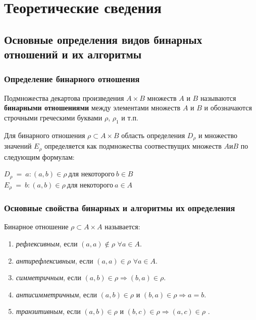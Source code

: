 \documentclass[bachelor, och, labwork]{shiza}
\begin{document}
\section{Теоретические сведения}

\subsection{Основные определения видов бинарных отношений и их алгоритмы}

\subsubsection{Определение бинарного отношения}

Подмножества декартова произведения $A \times B$ множеств $A$ и $B$ называются
\textbf{бинарными отношениями} между элементами множеств $A$ и $B$ и 
обозначаются строчными греческими буквами $\rho$, $\rho_1$ и т.п.

Для бинарного отношения $\rho\subset A \times B$ область определения $D_\rho$ и 
множество значений $E_\rho$ определяется как подмножества соотвествущих множеств 
$A \text{и} B$ по следующим формулам:

\begin{center}
    $D_\rho ~ = ~ {a : (a, b) \in\rho ~ \text{для некоторого} ~ b \in B}$
    $E_\rho ~ = ~ {b : (a, b) \in\rho ~ \text{для некоторого} ~ a \in A}$
\end{center}

\subsubsection{Основные свойства бинарных и алгоритмы их определения}

Бинарное отношение $\rho \subset A \times A$ называется:

\begin{enumerate}
    
    \item \textit{рефлексивным}, если $(a,a) \not\in\rho$ $\forall a \in A$.
    
    \item \textit{антирефлексивным}, если $(a,a) \in\rho$ $\forall a \in A$.
    
    \item \textit{симметричным}, если $(a,b) \in\rho\Rightarrow (b,a) \in\rho$.
    
    \item \textit{антисимметричным}, если $(a,b) \in\rho$ и $(b,a) \in\rho
    \Rightarrow a = b$.
    
    \item \textit{транзитивным}, если  $(a,b)\in\rho$ и $(b,c)\in\rho\Rightarrow 
    (a,c) \in\rho$ .

\end{enumerate}
\end{document}
